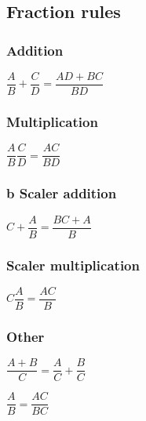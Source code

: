 \subsection{Fraction rules}

\subsubsection{Addition}

\(\dfrac{A}{B}+\dfrac{C}{D}=\dfrac{AD+BC}{BD}\)

\subsubsection{Multiplication}

\(\dfrac{A}{B}\dfrac{C}{D}=\dfrac{AC}{BD}\)

\subsubsection{b Scaler addition}

\(C+\dfrac{A}{B}=\dfrac{BC+A}{B}\)

\subsubsection{Scaler multiplication}

\(C\dfrac{A}{B}=\dfrac{AC}{B}\)

\subsubsection{Other}

\(\dfrac{A+B}{C}=\dfrac{A}{C}+\dfrac{B}{C}\)

\(\dfrac{A}{B}=\dfrac{AC}{BC}\)

